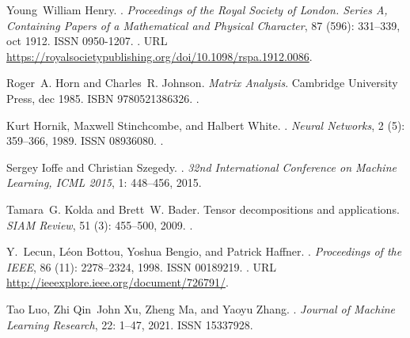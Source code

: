 \documentclass[twoside,11pt]{article}
\begin{document}
\begin{thebibliography}{36}
Young~William Henry.
.
\newblock \emph{Proceedings of the Royal Society of London. Series A,
  Containing Papers of a Mathematical and Physical Character}, 87
  (596): 331--339, oct 1912.
\newblock ISSN 0950-1207.
\newblock {}.
\newblock URL
  \url{https://royalsocietypublishing.org/doi/10.1098/rspa.1912.0086}.

Roger~A. Horn and Charles~R. Johnson.
\newblock \emph{{Matrix Analysis}}.
\newblock Cambridge University Press, dec 1985.
\newblock ISBN 9780521386326.
\newblock {}.

Kurt Hornik, Maxwell Stinchcombe, and Halbert White.
.
\newblock \emph{Neural Networks}, 2 (5): 359--366, 1989.
\newblock ISSN 08936080.
\newblock {}.

Sergey Ioffe and Christian Szegedy.
.
\newblock \emph{32nd International Conference on Machine Learning, ICML 2015},
  1: 448--456, 2015.

Tamara~G. Kolda and Brett~W. Bader.
\newblock Tensor decompositions and applications.
\newblock \emph{SIAM Review}, 51 (3): 455--500, 2009.
\newblock {}.

Y.~Lecun, L{\'{e}}on Bottou, Yoshua Bengio, and Patrick Haffner.
.
\newblock \emph{Proceedings of the IEEE}, 86 (11):
  2278--2324, 1998.
\newblock ISSN 00189219.
\newblock {}.
\newblock URL \url{http://ieeexplore.ieee.org/document/726791/}.

Tao Luo, Zhi Qin~John Xu, Zheng Ma, and Yaoyu Zhang.
.
\newblock \emph{Journal of Machine Learning Research}, 22: 1--47,
  2021.
\newblock ISSN 15337928.


\end{thebibliography}
\end{document}
